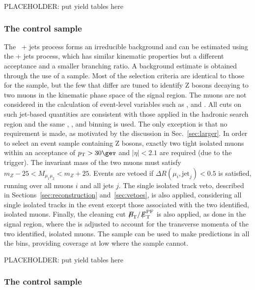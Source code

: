 PLACEHOLDER: put yield tables here 

\subsubsection{The \texorpdfstring{\mmj}{di-muon plus jets} control sample}

The \znunu\ + jets process forms an irreducible background and can be
estimated using the \zmumu + jets process, which has similar kinematic
properties but a different acceptance and a smaller branching ratio. A
background estimate is obtained through the use of a \mmj sample. Most
of the selection criteria are identical to those for the \mj sample,
but the few that differ are tuned to identify Z bosons decaying to two
muons in the kinematic phase space of the signal region. The muons are
not considered in the calculation of event-level variables such as
\scalht, \mht and \alphat. All cuts on such jet-based quantities are
consistent with those applied in the hadronic search region and the
same \njet, \nb, and \scalht binning is used. The only exception is
that no \alphat requirement is made, as motivated by the discussion in
Sec.~\ref{sec:larger}. In order to select an event sample containing Z
bosons, exactly two tight isolated muons within an acceptance of $\Pt
> 30\gev$ and $|\eta| < 2.1$ are required (due to the trigger). The
invariant mass of the two muons must satisfy $m_{Z} - 25 <
M_{\mu_1\mu_2} < m_{Z} + 25$. Events are vetoed if $\Delta
R(\mu_{i},\textrm{jet}_j) < 0.5$ is satisfied, running over all muons
$i$ and all jets $j$. The single isolated track veto, described in
Sections~\ref{sec:reconstruction} and~\ref{sec:vetoes}, is also
applied, considering all single isolated tracks in the event except
those associated with the two identified, isolated muons. Finally, the
cleaning cut $\mht/\pfmet$ is also applied, as done in the signal
region, where the \pfmet is adjusted to account for the transverse
momenta of the two identified, isolated muons. The \mmj sample can be
used to make predictions in all the \scalht bins, providing coverage
at low \scalht where the \gj sample cannot.

PLACEHOLDER: put yield tables here 

\subsubsection{The \texorpdfstring{\gj}{photon plus jets} control sample}

